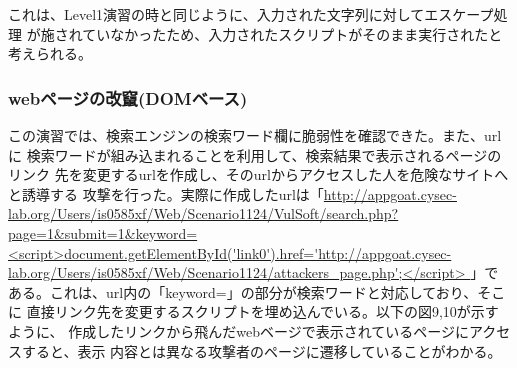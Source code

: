 \documentclass[dvipdfmx,autodetect-engine,titlepage]{jsarticle}
\begin{document}
これは、Level1演習の時と同じように、入力された文字列に対してエスケープ処理
が施されていなかったため、入力されたスクリプトがそのまま実行されたと考えられる。

\subsubsection*{webページの改竄(DOMベース)}
この演習では、検索エンジンの検索ワード欄に脆弱性を確認できた。また、urlに
検索ワードが組み込まれることを利用して、検索結果で表示されるページのリンク
先を変更するurlを作成し、そのurlからアクセスした人を危険なサイトへと誘導する
攻撃を行った。実際に作成したurlは「\url{http://appgoat.cysec-lab.org/Users/is0585xf/Web/Scenario1124/VulSoft/search.php?page=1&submit=1&keyword=<script>document.getElementById('link0').href='http://appgoat.cysec-lab.org/Users/is0585xf/Web/Scenario1124/attackers_page.php';</script>
}」である。これは、url内の「keyword=」の部分が検索ワードと対応しており、そこに
直接リンク先を変更するスクリプトを埋め込んでいる。以下の図9,10が示すように、
作成したリンクから飛んだwebベージで表示されているページにアクセスすると、表示
内容とは異なる攻撃者のページに遷移していることがわかる。
\end{document}
